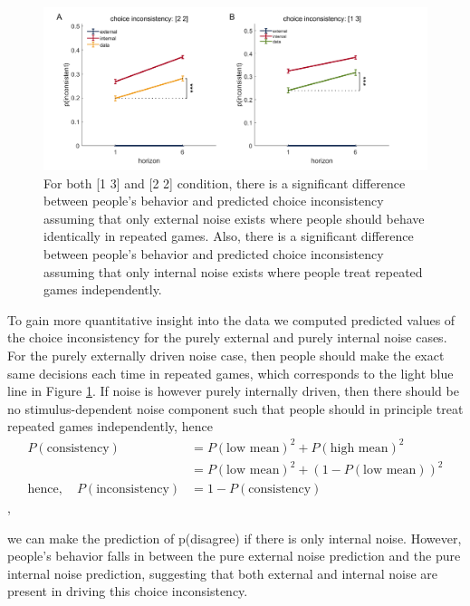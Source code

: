 \documentclass[12pt]{article}
\begin{document}
	\begin{figure}[H]
		\begin{center}
			\includegraphics[width=\textwidth]{figures/modelfree_intext.png}
			\caption{For both [1 3] and [2 2] condition, there is a significant difference between people's behavior and predicted choice inconsistency assuming that only external noise exists where people should behave identically in repeated games. Also, there is a significant difference between people's behavior and predicted choice inconsistency assuming that only internal noise exists where people treat repeated games independently. }
			\label{fig:mf2}
		\end{center}
	\end{figure}
	
	To gain more quantitative insight into the data we computed predicted values of the choice inconsistency for the purely external and purely internal noise cases.  For the purely externally driven noise case, then people should make the exact same decisions each time in repeated games, which corresponds to the light blue line in Figure \ref{fig:mf2}. If noise is however purely internally driven, then there should be no stimulus-dependent noise component such that people should in principle treat repeated games independently, hence 
	\begin{equation*}
	\begin{split}
	P(\mbox{consistency}) &= P(\mbox{low mean})^2 + P(\mbox{high mean})^2\\
	&= P(\mbox{low mean})^2 + (1-P(\mbox{low mean}))^2\\ \mbox{hence},\quad P(\mbox{inconsistency}) &= 1 - P(\mbox{consistency})
	\end{split}
	\end{equation*},
	
	we can make the prediction of p(disagree) if there is only internal noise. However, people's behavior falls in between the pure external noise prediction and the pure internal noise prediction, suggesting that both external and internal noise are present in driving this choice inconsistency.
	
\end{document}
